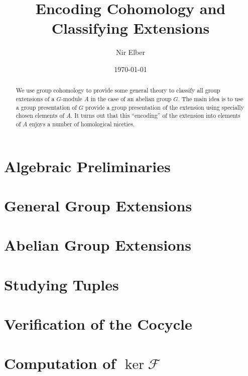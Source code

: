 \documentclass{article}
\title{Encoding Cohomology and Classifying Extensions}
\author{Nir Elber}
\date{\today}
\numberwithin{equation}{section}
\begin{document}
\maketitle

\begin{abstract}
	\noindent We use group cohomology to provide some general theory to classify all group extensions of a $ G$-module $A$ in the case of an abelian group $ G$. The main idea is to use a group presentation of $G$ provide a group presentation of the extension using specially chosen elements of $A$. It turns out that this ``encoding'' of the extension into elements of $A$ enjoys a number of homological niceties.
\end{abstract}

\setcounter{tocdepth}{4}
\tableofcontents

\section{Algebraic Preliminaries} \label{sec:crackpot}


\section{General Group Extensions} \label{sec:general}


\section{Abelian Group Extensions} \label{sec:abelian}


\section{Studying Tuples} \label{sec:tuplestudy}


\printbibliography[heading=bibintoc,title={References}]

\newpage
\appendix
\section{Verification of the Cocycle} \label{sec:verifycocycle}


\section{Computation of \texorpdfstring{$\ker\mathcal F$}{ker F}} \label{sec:havegensproof}

\end{document}
